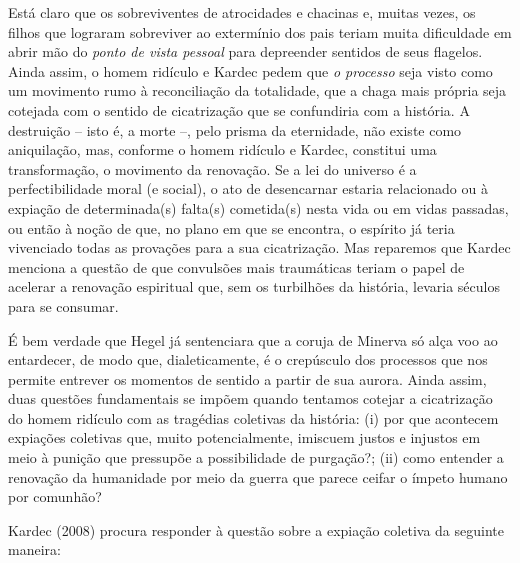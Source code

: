 Está claro que os sobreviventes de atrocidades e chacinas e, muitas
vezes, os filhos que lograram sobreviver ao extermínio dos pais teriam
muita dificuldade em abrir mão do \emph{ponto de vista pessoal} para
depreender sentidos de seus flagelos. Ainda assim, o homem ridículo e
Kardec pedem que \emph{o processo} seja visto como um movimento rumo à
reconciliação da totalidade, que a chaga mais própria seja cotejada com
o sentido de cicatrização que se confundiria com a história. A
destruição -- isto é, a morte --, pelo prisma da eternidade, não existe
como aniquilação, mas, conforme o homem ridículo e Kardec, constitui uma
transformação, o movimento da renovação. Se a lei do universo é a
perfectibilidade moral (e social), o ato de desencarnar estaria
relacionado ou à expiação de determinada(s) falta(s) cometida(s) nesta
vida ou em vidas passadas, ou então à noção de que, no plano em que se
encontra, o espírito já teria vivenciado todas as provações para a sua
cicatrização. Mas reparemos que Kardec menciona a questão de que
convulsões mais traumáticas teriam o papel de acelerar a renovação
espiritual que, sem os turbilhões da história, levaria séculos para se
consumar.

É bem verdade que Hegel já sentenciara que a coruja de Minerva só alça
voo ao entardecer, de modo que, dialeticamente, é o crepúsculo dos
processos que nos permite entrever os momentos de sentido a partir de
sua aurora. Ainda assim, duas questões fundamentais se impõem quando
tentamos cotejar a cicatrização do homem ridículo com as tragédias
coletivas da história: (i) por que acontecem expiações coletivas que,
muito potencialmente, imiscuem justos e injustos em meio à punição que
pressupõe a possibilidade de purgação?; (ii) como entender a renovação
da humanidade por meio da guerra que parece ceifar o ímpeto humano por
comunhão?

Kardec (2008) procura responder à questão sobre a expiação coletiva da
seguinte maneira:

